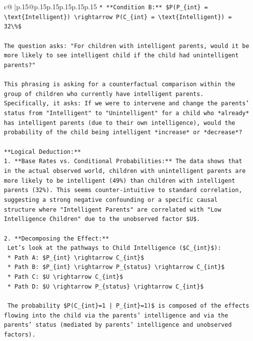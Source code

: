 \documentclass{article}
\begin{document}
{\begin{supertabular}{c@{$\;$}|p{.15\linewidth}@{}p{.15\linewidth}p{.15\linewidth}p{.15\linewidth}p{.15\linewidth}p{.15\linewidth}}
{{{\texttt{*   **Condition B:** \$P(P\_\{int\} = \textbackslash{}text\{Intelligent\}) \textbackslash{}rightarrow P(C\_\{int\} = \textbackslash{}text\{Intelligent\}) = 32\textbackslash{}\%\$} \\
\\ 
\texttt{The question asks: "For children with intelligent parents, would it be more likely to see intelligent child if the child had unintelligent parents?"} \\
\\ 
\texttt{This phrasing is asking for a counterfactual comparison within the group of children who currently have intelligent parents. Specifically, it asks: If we were to intervene and change the parents' status from "Intelligent" to "Unintelligent" for a child who *already* has intelligent parents (due to their own intelligence), would the probability of the child being intelligent *increase* or *decrease*?} \\
\\ 
\texttt{**Logical Deduction:**} \\
\texttt{1.  **Base Rates vs. Conditional Probabilities:** The data shows that in the actual observed world, children with unintelligent parents are more likely to be intelligent (49\%) than children with intelligent parents (32\%). This seems counter{-}intuitive to standard correlation, suggesting a strong negative confounding or a specific causal structure where "Intelligent Parents" are correlated with "Low Intelligence Children" due to the unobserved factor \$U\$.} \\
\\ 
\texttt{2.  **Decomposing the Effect:**} \\
\texttt{    Let's look at the pathways to Child Intelligence (\$C\_\{int\}\$):} \\
\texttt{    *   Path A: \$P\_\{int\} \textbackslash{}rightarrow C\_\{int\}\$} \\
\texttt{    *   Path B: \$P\_\{int\} \textbackslash{}rightarrow P\_\{status\} \textbackslash{}rightarrow C\_\{int\}\$} \\
\texttt{    *   Path C: \$U \textbackslash{}rightarrow C\_\{int\}\$} \\
\texttt{    *   Path D: \$U \textbackslash{}rightarrow P\_\{status\} \textbackslash{}rightarrow C\_\{int\}\$} \\
\\ 
\texttt{    The probability \$P(C\_\{int\}=1 | P\_\{int\}=1)\$ is composed of the effects flowing into the child via the parents' intelligence and via the parents' status (mediated by parents' intelligence and unobserved factors).} \\
}}}
\end{supertabular}}
\end{document}
